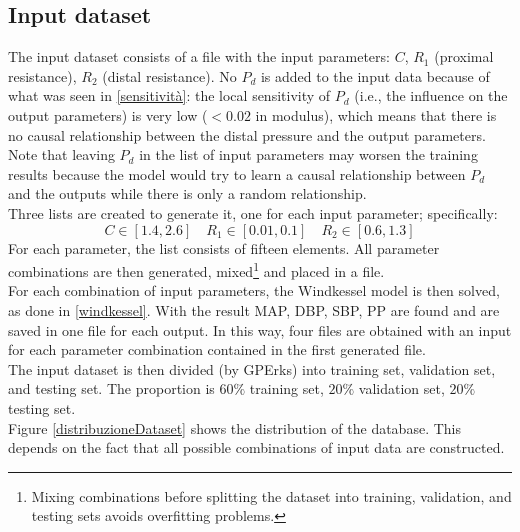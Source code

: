 \subsection{Input dataset}\label{Risultati training: dataset}
The input dataset consists of a file with the input parameters: $C$, $R_1$ (proximal resistance), $R_2$ (distal resistance). No $P_d$ is added to the input data because of what was seen in \ref{sensitività}: the local sensitivity of $P_d$ (i.e., the influence on the output parameters) is very low ($<0.02$ in modulus), which means that there is no causal relationship between the distal pressure and the output parameters. Note that leaving $P_d$ in the list of input parameters may worsen the training results because the model would try to learn a causal relationship between $P_d$ and the outputs while there is only a random relationship.\\
Three lists are created to generate it, one for each input parameter; specifically:
\[
C\in [1.4, 2.6] \quad R_1\in [0.01, 0.1] \quad R_2\in [0.6, 1.3]
\]
For each parameter, the list consists of fifteen elements. All parameter combinations are then generated, mixed\footnote{Mixing combinations before splitting the dataset into training, validation, and testing sets avoids overfitting problems.} and placed in a file.\\
For each combination of input parameters, the Windkessel model is then solved, as done in \ref{windkessel}. With the result MAP, DBP, SBP, PP are found and are saved in one file for each output. In this way, four files are obtained with an input for each parameter combination contained in the first generated file.\\
The input dataset is then divided (by GPErks) into training set, validation set, and testing set. The proportion is $60\%$ training set, $20\%$ validation set, $20\%$ testing set.\\

\newpage
Figure \ref{distribuzioneDataset} shows the distribution of the database. This depends on the fact that all possible combinations of input data are constructed.

